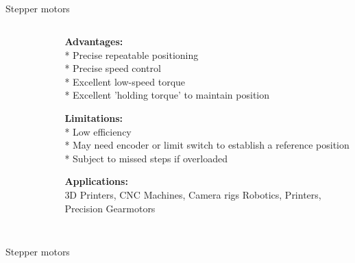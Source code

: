 \subsection{}
{
\begin{frame}{Stepper motors}

\begin{columns}
\begin{column}{0.45\textwidth}  %

	\vspace{-3mm}
   	\begin{figure}
 	\end{figure}

\end{column}

\begin{column}{0.55\textwidth}

{\bf Advantages:} \\
* Precise repeatable positioning \\
* Precise speed control \\
* Excellent low-speed torque \\
* Excellent 'holding torque' to maintain position


{\bf Limitations:} \\
* Low efficiency \\
* May need encoder or limit switch to establish a reference position \\
* Subject to missed steps if overloaded


{\bf Applications:} \\
3D Printers, 
CNC Machines, 
Camera rigs Robotics, 
Printers, 
Precision Gearmotors






\end{column}
\end{columns}
\end{frame}
}


\subsection{}
{
\begin{frame}{Stepper motors}

	\vspace{-3mm}
   	\begin{figure}
 	\end{figure}

\end{frame}
}







